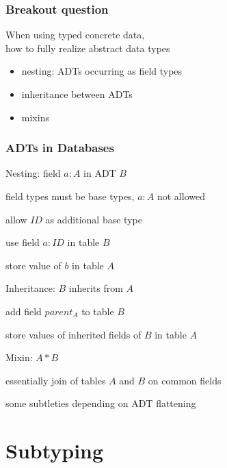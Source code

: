 \begin{frame}\frametitle{Breakout question}
When using typed concrete data,\\
how to fully realize abstract data types
\begin{itemize}
\item nesting: ADTs occurring as field types
\item inheritance between ADTs
\item mixins
\end{itemize}
\end{frame}

\begin{frame}\frametitle{ADTs in Databases}
\begin{blockitems}{Nesting: field $a:A$ in ADT $B$}
\item field types must be base types, $a:A$ not allowed
\item allow $ID$ as additional base type
\item use field $a:ID$ in table $B$
\item store value of $b$ in table $A$
\end{blockitems}

\begin{blockitems}{Inheritance: $B$ inherits from $A$}
\item add field $parent_A$ to table $B$
\item store values of inherited fields of $B$ in table $A$
\end{blockitems}

\begin{blockitems}{Mixin: $A*B$}
\item essentially join of tables $A$ and $B$ on common fields
\item some subtleties depending on ADT flattening
\end{blockitems}
\end{frame}

\section{Subtyping}

